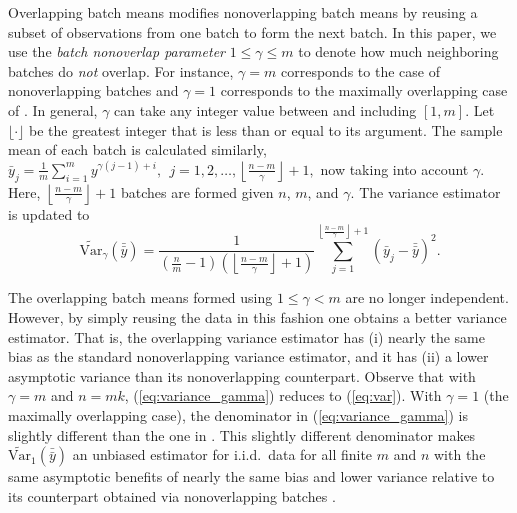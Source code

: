 \documentclass[12pt]{article}
\newcommand{\vartg}[1]{\widetilde{\mathrm{Var}}_\gamma \left( #1 \right)}
\newcommand{\vto}[1]{\widetilde{\mathrm{Var}}_{1} \left( #1 \right)}
\newcommand{\nb}{\left\lfloor\tfrac{n-m}{\gamma}\right\rfloor+1}
\newcommand{\yb}{\bar{y}}
\newcommand{\ybb}{\bar{\yb}}
\begin{document}
Overlapping batch means modifies nonoverlapping batch means by reusing a subset of observations from one batch to form the next batch. 
In this paper, we use the {\it batch nonoverlap parameter} $1 \leq \gamma \leq m$ to denote how much neighboring batches do {\it not} overlap.  
For instance, $\gamma = m$ corresponds to the case of nonoverlapping batches and $\gamma = 1$ corresponds to the maximally overlapping case of \citet{Meketon1984}.  
In general, $\gamma$ can take any integer value between and including $[1,m]$. 
Let $\lfloor \cdot \rfloor$ be the greatest integer that is less than or equal to its argument. 
The sample mean of each batch is calculated similarly, 
$
\yb_j = \frac{1}{m} \sum_{i=1}^m y^{\gamma(j-1) + i},\ \  j = 1, 2, \dots, \nb, 
$
now taking into account $\gamma$.  
Here, $\nb$ batches are formed given $n$, $m$, and $\gamma$.  
The variance estimator is updated to
\begin{equation} \label{eq:variance_gamma}
	\vartg{\ybb} = \frac{1}{\left( \tfrac{n}{m} - 1 \right) \left( \nb \right)}  \sum_{j=1}^{\nb} (\yb_j - \ybb)^2.
\end{equation}

The overlapping batch means 
formed using $1 \leq \gamma < m$ 
are no longer independent. 
However, by simply reusing the data in this fashion one obtains a better variance estimator. 
That is, the overlapping variance estimator has (i) nearly the same bias as the standard nonoverlapping variance estimator, and it has (ii)
a lower asymptotic variance than its nonoverlapping counterpart. 
Observe that with $\gamma=m$ and $n=mk$, (\ref{eq:variance_gamma}) reduces to (\ref{eq:var}).
With $\gamma=1$ (the maximally overlapping case), the denominator in (\ref{eq:variance_gamma}) is slightly different than the one in  \citep{Meketon1984}.
This slightly different denominator 
makes $\vto{\ybb}$ an unbiased estimator for i.i.d.\ data for all finite $m$ and $n$ with the same asymptotic benefits of nearly the same bias and lower variance relative to its counterpart obtained via nonoverlapping batches \citep{Song1992}. 
 
\end{document}
